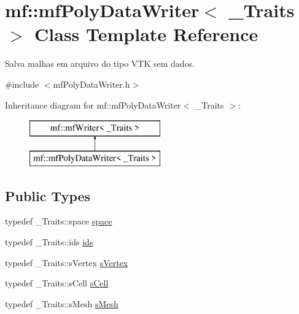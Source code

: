\hypertarget{classmf_1_1mfPolyDataWriter}{
\section{mf::mfPolyDataWriter$<$ \_\-Traits $>$ Class Template Reference}
\label{classmf_1_1mfPolyDataWriter}
}


Salva malhas em arquivo do tipo VTK sem dados.  




{\ttfamily \#include $<$mfPolyDataWriter.h$>$}

Inheritance diagram for mf::mfPolyDataWriter$<$ \_\-Traits $>$:\begin{figure}[H]
\begin{center}
\leavevmode
\includegraphics[height=2.000000cm]{classmf_1_1mfPolyDataWriter}
\end{center}
\end{figure}
\subsection*{Public Types}
\begin{DoxyCompactItemize}
\item 
typedef \_\-Traits::space \hyperlink{classmf_1_1mfPolyDataWriter_a386a48d93bcf6f9febdb9730fc67443b}{space}
\item 
typedef \_\-Traits::ids \hyperlink{classmf_1_1mfPolyDataWriter_ae7e024a913c218669ede149f7771f85e}{ids}
\item 
typedef \_\-Traits::sVertex \hyperlink{classmf_1_1mfPolyDataWriter_ad9ede939e471c1075cfed0007cbe027c}{sVertex}
\item 
typedef \_\-Traits::sCell \hyperlink{classmf_1_1mfPolyDataWriter_a271a825b5446e6c388a238e577840920}{sCell}
\item 
typedef \_\-Traits::sMesh \hyperlink{classmf_1_1mfPolyDataWriter_a4ce58a6aa7139b3d903cc453c4585e6f}{sMesh}
\end{DoxyCompactItemize}
